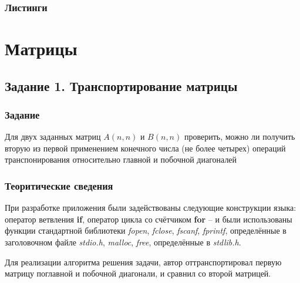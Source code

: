 \documentclass[12pt,a4paper]{report}
\begin{document}
\subsection*{Листинги}
\begin{itemize}

\end{itemize}

%
\chapter{Матрицы}
\section{Задание 1. Транспортирование матрицы}
\subsection{Задание}
\hspace{\parindent}
Для двух заданных матриц $A(n,n)$ и $B(n,n)$ проверить, можно ли получить вторую из первой применением конечного числа (не более четырех) операций транспонирования относительно главной и побочной диагоналей

\subsection{Теоритические сведения}
\hspace{\parindent}
При разработке приложения были задействованы следующие конструкции языка: оператор ветвления \textbf{if}, оператор цикла со счётчиком \textbf{for} -- и были использованы функции стандартной библиотеки \textit{fopen}, \textit{fclose}, \textit{fscanf}, \textit{fprintf}, определённые в заголовочном файле \textit{stdio.h}, \textit{malloc}, \textit{free}, определённые в \textit{stdlib.h}.

\hspace{\parindent}
Для реализации алгоритма решения задачи, автор оттранспортировал первую матрицу поглавной и побочной диагонали, и сравнил со второй матрицей. 
\end{document}
